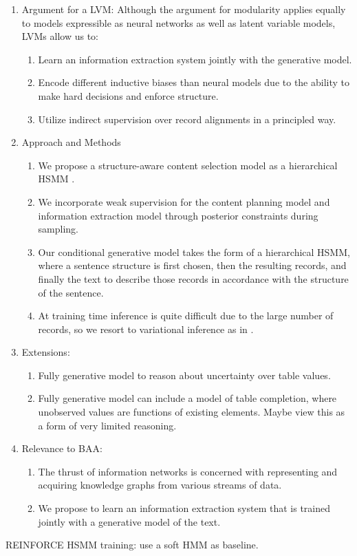 \documentclass[11pt]{article}
\begin{document}
\begin{enumerate}
\item Argument for a LVM:
Although the argument for modularity applies equally to models expressible as
neural networks as well as latent variable models, LVMs allow us to:
\begin{enumerate}
\item Learn an information extraction system jointly with the generative model.
\item Encode different inductive biases than neural models due to the ability to make hard decisions
and enforce structure.
\item Utilize indirect supervision over record alignments in a principled way.
\end{enumerate}
\item Approach and Methods
\begin{enumerate}
\item We propose a structure-aware content selection \citep{sauper2009wiki} model
as a hierarchical HSMM \citep{wiseman2018template}.
\item We incorporate weak supervision for the content planning model and
information extraction model through posterior constraints during sampling.
\item Our conditional generative model takes the form of a hierarchical
HSMM, where a sentence structure is first chosen, then the resulting records, and finally
the text to describe those records in accordance with the structure of the sentence.
\item At training time inference is quite difficult due to the large number of records,
so we resort to variational inference as in \citep{deng2018vattn}. 
\end{enumerate}
\item Extensions:
\begin{enumerate}
\item Fully generative model to reason about uncertainty over table values.
\item Fully generative model can include a model of table completion,
where unobserved values are functions of existing elements.
Maybe view this as a form of very limited reasoning.
\end{enumerate}
\item Relevance to BAA:
\begin{enumerate}
\item The thrust of information networks is concerned with representing
and acquiring knowledge graphs from various streams of data.
\item We propose to learn an information extraction system that is trained 
jointly with a generative model of the text.
\end{enumerate}
\end{enumerate}

REINFORCE HSMM training: use a soft HMM as baseline.



\end{document}

